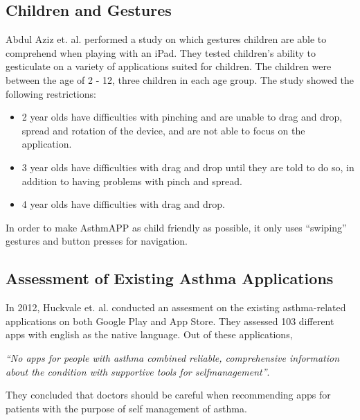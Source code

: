 \subsection{Children and Gestures}
\label{sec:childrenandgestures}
Abdul Aziz et. al.\cite{aziz2013children} performed a study on which gestures children are able to comprehend when playing with an iPad. They tested children's ability to gesticulate on a variety of applications suited for children. The children were between the age of 2 - 12, three children in each age group. The study showed the following restrictions:

\begin{itemize}
  \item 2 year olds have difficulties with pinching and are unable to drag and drop, spread and rotation of the device, and are not able to focus on the application. 
  \item 3 year olds have difficulties with drag and drop until they are told to do so, in addition to having problems with pinch and spread. 
  \item 4 year olds have difficulties with drag and drop. 
\end{itemize}

In order to make AsthmAPP as child friendly as possible, it only uses ``swiping'' gestures and button presses for navigation.


\subsection{Assessment of Existing Asthma Applications}
In 2012, Huckvale et. al.\cite{huckvale2012apps} conducted an assesment on the existing asthma-related applications on both Google Play and App Store. They assessed 103 different apps with english as the native language. Out of these applications, 

\emph{``No apps for people with asthma combined reliable, comprehensive information about the condition with supportive tools for self­management''}\cite{huckvale2012apps}. 

They concluded that doctors should be careful when recommending apps for patients with the purpose of self management of asthma.
